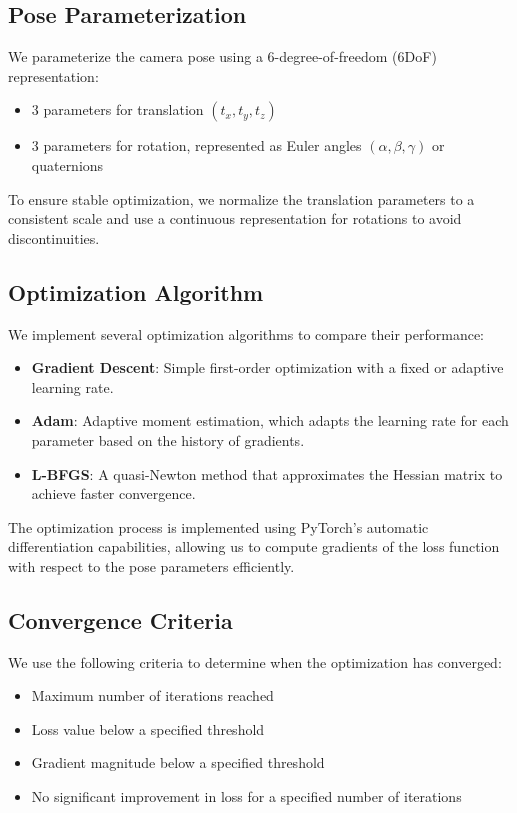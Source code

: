 \subsection{Pose Parameterization}
We parameterize the camera pose using a 6-degree-of-freedom (6DoF) representation:

\begin{itemize}
    \item 3 parameters for translation $(t_x, t_y, t_z)$
    \item 3 parameters for rotation, represented as Euler angles $(\alpha, \beta, \gamma)$ or quaternions
\end{itemize}

To ensure stable optimization, we normalize the translation parameters to a consistent scale and use a continuous representation for rotations to avoid discontinuities.

\subsection{Optimization Algorithm}
We implement several optimization algorithms to compare their performance:

\begin{itemize}
    \item \textbf{Gradient Descent}: Simple first-order optimization with a fixed or adaptive learning rate.
    \item \textbf{Adam}: Adaptive moment estimation, which adapts the learning rate for each parameter based on the history of gradients.
    \item \textbf{L-BFGS}: A quasi-Newton method that approximates the Hessian matrix to achieve faster convergence.
\end{itemize}

The optimization process is implemented using PyTorch's automatic differentiation capabilities, allowing us to compute gradients of the loss function with respect to the pose parameters efficiently.

\subsection{Convergence Criteria}
We use the following criteria to determine when the optimization has converged:

\begin{itemize}
    \item Maximum number of iterations reached
    \item Loss value below a specified threshold
    \item Gradient magnitude below a specified threshold
    \item No significant improvement in loss for a specified number of iterations
\end{itemize}

